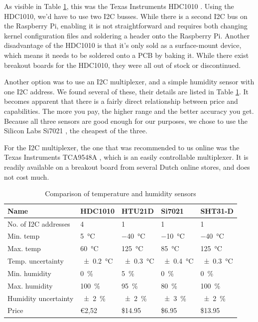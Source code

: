 \documentclass[a4paper,oneside]{book}
\begin{document}
As visible in Table \ref{tab:humidity}, this was the Texas Instruments HDC1010
\cite{HDC1010}. Using the HDC1010, we'd have to use two I2C busses. While there
is a second I2C bus on the Raspberry Pi, enabling it is not straightforward and
requires both changing kernel configuration files and soldering a header onto
the Raspberry Pi. Another disadvantage of the HDC1010 is that it's only sold as
a surface-mount device, which means it needs to be soldered onto a PCB by
baking it. While there exist breakout boards for the HDC1010, they were all out
of stock or discontinued.

Another option was to use an I2C multiplexer, and a simple humidity sensor with
one I2C address. We found several of these, their details are listed in Table
\ref{tab:humidity}. It becomes apparent that there is a fairly direct
relationship between price and capabilities. The more you pay, the higher range
and the better accuracy you get. Because all three sensors are good enough for
our purposes, we chose to use the Silicon Labs Si7021 \cite{Si7021}, the
cheapest of the three.

For the I2C multiplexer, the one that was recommended to us online was the
Texas Instruments TCA9548A \cite{TCA9548A}, which is an easily controllable
multiplexer. It is readily available on a breakout board from several Dutch
online stores, and does not cost much.

\begin{table}[]
\centering
\begin{tabular}{lllll}
Name                 & HDC1010                & HTU21D                 & Si7021                & SHT31-D                \\ \hline
No. of I2C addresses & 4                      & 1                      & 1                     & 1                      \\
Min. temp            & \SI{5}{\celsius}       & \SI{-40}{\celsius}     & \SI{-10}{\celsius}    & \SI{-40}{\celsius}     \\
Max. temp            & \SI{60}{\celsius}      & \SI{125}{\celsius}     & \SI{85}{\celsius}     & \SI{125}{\celsius}     \\
Temp. uncertainty    & \SI{\pm0.2}{\celsius}  & \SI{\pm0.3}{\celsius}  & \SI{\pm0.4}{\celsius} & \SI{\pm0.3}{\celsius}  \\
Min. humidity        & \SI{0}{\percent}       & \SI{5}{\percent}       & \SI{0}{\percent}      & \SI{0}{\percent}       \\
Max. humidity        & \SI{100}{\percent}     & \SI{95}{\percent}      & \SI{80}{\percent}     & \SI{100}{\percent}     \\
Humidity uncertainty & \SI{\pm2}{\percent}    & \SI{\pm2}{\percent}    & \SI{\pm3}{\percent}   & \SI{\pm2}{\percent}    \\
Price                & \euro 2,52             & \$14.95                & \$6.95                & \$13.95
\end{tabular}
\caption{Comparison of temperature and humidity sensors \protect\cite{HDC1010}
\protect\cite{HTU21D} \protect\cite{Si7021} \protect\cite{SHT31-D}}
\label{tab:humidity}
\end{table}
\end{document}
